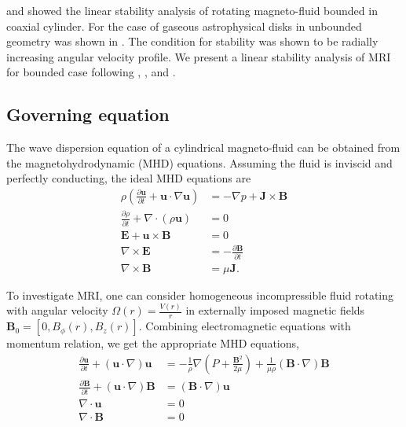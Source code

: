 \documentclass{jfm}
\newcommand{\del}{\nabla}
\begin{document}
\cite{Acheson1973} and \cite{Knobloch1992} showed the linear stability analysis of rotating magneto-fluid bounded in coaxial cylinder. For the case of gaseous astrophysical disks in unbounded geometry was shown in \cite{Balbus1991}. The condition for stability was shown to be radially increasing angular velocity profile. We present a linear stability analysis of MRI for bounded case following \cite{Acheson1972}, \cite{Acheson1973a}, \cite{Knobloch1992} and \cite{Julien2010}.


%
%
\subsection{Governing equation}

The wave dispersion equation of a cylindrical magneto-fluid can be obtained from the magnetohydrodynamic (MHD) equations. Assuming the fluid is inviscid and perfectly conducting, the ideal MHD equations are
\begin{align}
    \rho\left(\frac{\partial\mathbf{u}}{\partial t}+\mathbf{u}\cdot\del\mathbf{u}\right) &= -\del p +\mathbf{J}\times\mathbf{B} \\
    \frac{\partial \rho}{\partial t} + \del\cdot(\rho \mathbf{u})&=0 \\
    \mathbf{E}+\mathbf{u}\times\mathbf{B}&=0 \\
    \del\times \mathbf{E} &= -\frac{\partial \mathbf{B}}{\partial t} \\
    \del \times \mathbf{B} &= \mu \mathbf{J}.
\end{align}

To investigate MRI, one can consider homogeneous incompressible fluid rotating with angular velocity $\Omega(r)=\frac{V(r)}{r}$ in externally imposed magnetic fields $\mathbf{B}_0 = [0,B_\phi(r),B_z(r)]$. Combining electromagnetic equations with momentum relation, we get the appropriate MHD equations,
\begin{align}
    \frac{\partial \mathbf{u}}{\partial t}+(\mathbf{u}\cdot\del)\mathbf{u} &= -\frac{1}{\rho}\del\left(P+\frac{\mathbf{B}^2}{2\mu}\right)+\frac{1}{\mu\rho}(\mathbf{B}\cdot\del)\mathbf{B}\\
    \frac{\partial \mathbf{B}}{\partial t} +(\mathbf{u}\cdot\del)\mathbf{B} &=(\mathbf{B}\cdot\del)\mathbf{u} \\
    \del\cdot\mathbf{u}&=0\\
    \del \cdot \mathbf{B} &=0
\end{align}


%
%
\end{document}
